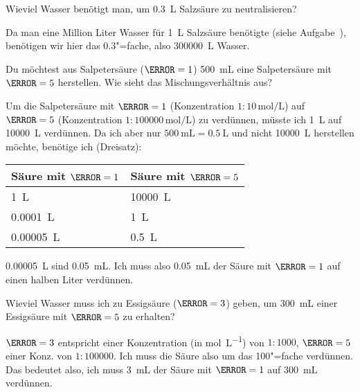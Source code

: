 \documentclass{scrartcl}
\begin{document}
\begin{question}
  Wieviel Wasser benötigt man, um \SI{0.3}{\liter} Salzsäure zu neutralisieren?
\end{question}
\begin{solution}
  Da man eine Million Liter Wasser für \SI{1}{\liter} Salzsäure benötigte
  (siehe Aufgabe~), benötigen wir hier das
  \num{0.3}"=fache, also \SI{300000}{\liter} Wasser.
\end{solution}

\begin{question}
  Du möchtest aus Salpetersäure ($\pH = 1$) \SI{500}{\milli\liter} eine
  Salpetersäure mit $\pH = 5$ herstellen.  Wie sieht das Mischungsverhältnis
  aus?
\end{question}
\begin{solution}
  Um die Salpetersäure mit $\pH = 1$ (Konzentration
  $1:10\,\si{\mole\per\liter}$) auf $\pH = 5$ (Konzentration
  $\num{1}:\num{100000}\,\si{\mole\per\liter}$) zu verdünnen, müsste ich
  \SI{1}{\liter} auf \SI{10000}{\liter} verdünnen.  Da ich aber nur
  $\SI{500}{\milli\liter} = \SI{0.5}{\liter}$ und nicht \SI{10000}{\liter}
  herstellen möchte, benötige ich (Dreisatz):
  \begin{center}
    \begin{tabular}{ll}
        Säure mit $\pH = 1$  & Säure mit $\pH = 5$ \\
      \midrule
        \SI{1}{\liter}       & \SI{10000}{\liter} \\
        \SI{0.0001}{\liter}  & \SI{1}{\liter} \\
        \SI{0.00005}{\liter} & \SI{0.5}{\liter}
    \end{tabular}
  \end{center}
  \SI{0.00005}{\liter} sind \SI{0.05}{\milli\liter}.  Ich muss also
  \SI{0.05}{\milli\liter} der Säure mit $\pH = 1$ auf einen halben Liter
  verdünnen.
\end{solution}

\begin{question}
  Wieviel Wasser muss ich zu Essigsäure ($\pH = 3$) geben, um
  \SI{300}{\milli\liter} einer Essigsäure mit $\pH = 5$ zu erhalten?
\end{question}
\begin{solution}
  $\pH = 3$ entspricht einer Konzentration (in \si{\mole\per\liter}) von
  $\num{1}:\num{1000}$, $\pH = 5$ einer Konz. von $\num{1}:\num{100000}$.  Ich
  muss die Säure also um das \num{100}"=fache verdünnen. Das bedeutet also,
  ich muss \SI{3}{\milli\liter} der Säure mit $\pH = 1$ auf
  \SI{300}{\milli\liter} verdünnen.
\end{solution}
\end{document}
